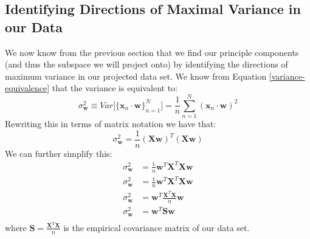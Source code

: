 \subsection{Identifying Directions of Maximal Variance in our Data}
We now know from the previous section that we find our principle components (and thus the subspace we will project onto) by identifying the directions of maximum variance in our projected data set. We know from Equation \ref{variance-equivalence} that the variance is equivalent to:
\begin{equation*}
    \sigma^{2}_{\textbf{w}} \equiv Var\big[\{\textbf{x}_{n} \cdot \textbf{w}\}_{n=1}^{N}\big] = \frac{1}{n} \sum_{n=1}^{N} (\textbf{x}_{n} \cdot \textbf{w})^{2}
\end{equation*}
Rewriting this in terms of matrix notation we have that:
\begin{equation*}
    \sigma^{2}_{\textbf{w}} = \frac{1}{n} (\textbf{X} \textbf{w})^{T} (\textbf{X} \textbf{w})
\end{equation*}
We can further simplify this:
\begin{align*}
    \sigma^{2}_{\textbf{w}} &= \frac{1}{n} \textbf{w}^{T}\textbf{X}^{T} \textbf{X} \textbf{w} \\
    \sigma^{2}_{\textbf{w}} &= \frac{1}{n} \textbf{w}^{T}\textbf{X}^{T} \textbf{X} \textbf{w} \\
    \sigma^{2}_{\textbf{w}} &= \textbf{w}^{T} \frac{\textbf{X}^{T}\textbf{X}}{n} \textbf{w} \\
    \sigma^{2}_{\textbf{w}} &= \textbf{w}^{T} \textbf{S} \textbf{w} \\
\end{align*}
where $\textbf{S} = \frac{\textbf{X}^{T}\textbf{X}}{n}$ is the empirical covariance matrix of our data set.


